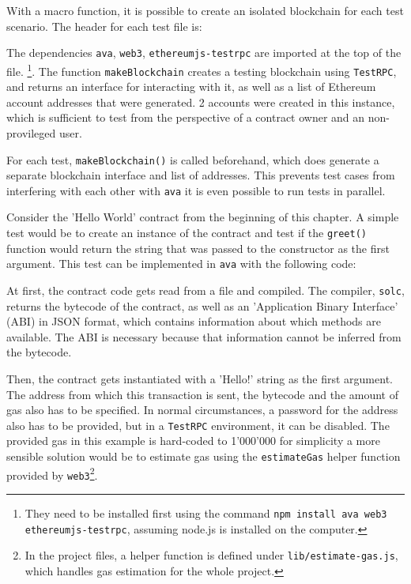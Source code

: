 With a macro function, it is possible to create an isolated blockchain for each test scenario. The header for each test file is:



The dependencies \texttt{ava}, \texttt{web3}, \texttt{ethereumjs-testrpc} are imported at the top of the file. \footnote{They need to be installed first using the command \texttt{npm install ava web3 ethereumjs-testrpc}, assuming node.js is installed on the computer.}. The function \texttt{makeBlockchain} creates a testing blockchain using \texttt{TestRPC}, and returns an interface for interacting with it, as well as a list of Ethereum account addresses that were generated. 2 accounts were created in this instance, which is sufficient to test from the perspective of a contract owner and an non-provileged user.

For each test, \texttt{makeBlockchain()} is called beforehand, which does generate a separate blockchain interface and list of addresses. This prevents test cases from interfering with each other \textemdash{} with \texttt{ava} it is even possible to run tests in parallel.

Consider the 'Hello World' contract from the beginning of this chapter. A simple test would be to create an instance of the contract and test if the \texttt{greet()} function would return the string that was passed to the constructor as the first argument. This test can be implemented in \texttt{ava} with the following code:



At first, the contract code gets read from a file and compiled. The compiler, \texttt{solc}, returns the bytecode of the contract, as well as an 'Application Binary Interface' (ABI) in JSON format, which contains information about which methods are available. The ABI is necessary because that information cannot be inferred from the bytecode.

Then, the contract gets instantiated with a 'Hello!' string as the first argument. The address from which this transaction is sent, the bytecode and the amount of gas also has to be specified.
In normal circumstances, a password for the address also has to be provided, but in a \texttt{TestRPC} environment, it can be disabled.
The provided gas in this example is hard-coded to 1'000'000 for simplicity \textendash{} a more sensible solution would be to estimate gas using the \texttt{estimateGas} helper function provided by \texttt{web3}\footnote{In the project files, a helper function is defined under \texttt{lib/estimate-gas.js}, which handles gas estimation for the whole project.}.

